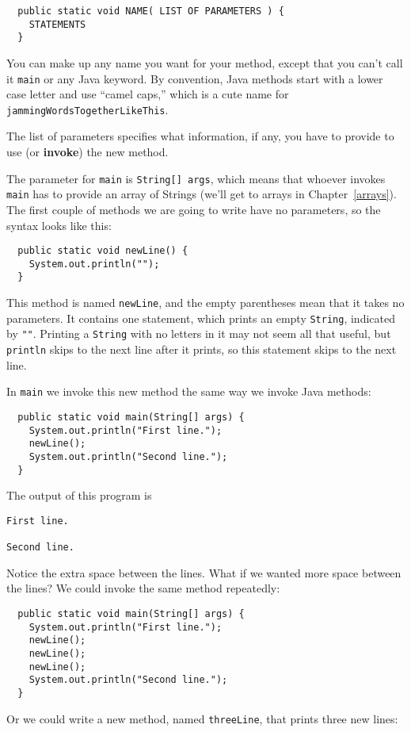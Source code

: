 \documentclass[12pt]{book}
\theoremstyle{definition}
\begin{document}
\begin{lstlisting}
  public static void NAME( LIST OF PARAMETERS ) {
    STATEMENTS
  }
\end{lstlisting}
%
You can make up any name you want for your method, except
that you can't call it {\tt main} or any
Java keyword.  By convention, Java methods start with a lower
case letter and use ``camel caps,'' which is a cute name for
{\tt jammingWordsTogetherLikeThis}.

The list of parameters specifies what information, if any, you have to
provide to use (or {\bf invoke}) the new method.

The parameter for {\tt main} is {\tt String[] args}, which
means that whoever invokes {\tt main} has to provide an array of
Strings (we'll get to arrays in Chapter~\ref{arrays}).  The first
couple of methods we are going to write have no parameters, so the
syntax looks like this:

\begin{lstlisting}
  public static void newLine() {
    System.out.println("");
  }
\end{lstlisting}
%
This method is named {\tt newLine}, and the empty parentheses
mean that it takes no parameters.  It contains one
statement, which prints an empty {\tt String}, indicated by {\tt ""}.
Printing a {\tt String} with no letters in it may not seem all that
useful, but {\tt println} skips to the next
line after it prints, so this statement skips to the next line.

In {\tt main} we invoke this new method the same way we invoke 
Java methods:

\begin{lstlisting}
  public static void main(String[] args) {
    System.out.println("First line.");
    newLine();
    System.out.println("Second line.");
  }
\end{lstlisting}
%
The output of this program is

\begin{lstlisting}
First line.

Second line.
\end{lstlisting}
%
Notice the extra space between the lines.  What if we wanted
more space between the lines?  We could invoke the same
method repeatedly:

\begin{lstlisting}
  public static void main(String[] args) {
    System.out.println("First line.");
    newLine();
    newLine();
    newLine();
    System.out.println("Second line.");
  }
\end{lstlisting}
%
Or we could write a new method, named {\tt threeLine}, that 
prints three new lines:
\end{document}
